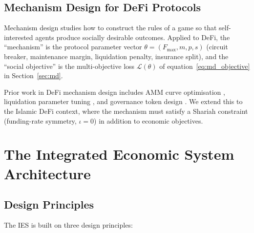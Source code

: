 \documentclass[10pt,twocolumn]{article}
\theoremstyle{plain}
\theoremstyle{definition}
\begin{document}
\subsection{Mechanism Design for DeFi Protocols}

Mechanism design \cite{Hurwicz1972,Myerson1981} studies how
to construct the rules of a game so that self-interested
agents produce socially desirable outcomes.  Applied to DeFi,
the ``mechanism'' is the protocol parameter vector $\theta
= (F_{\max}, m, p, s)$ (circuit breaker, maintenance margin,
liquidation penalty, insurance split), and the ``social
objective'' is the multi-objective loss
$\mathcal{L}(\theta)$ of equation~\eqref{eq:md_objective}
in Section~\ref{sec:md}.

Prior work in DeFi mechanism design includes AMM curve
optimisation \cite{Angeris2021}, liquidation parameter
tuning \cite{Gudgeon2020}, and governance token design
\cite{Fritsch2021}.  We extend this to the Islamic DeFi
context, where the mechanism must satisfy a Shariah
constraint (funding-rate symmetry, $\iota=0$) in addition
to economic objectives.

\section{The Integrated Economic System Architecture}
\label{sec:architecture}

\subsection{Design Principles}

The IES is built on three design principles:
\end{document}
